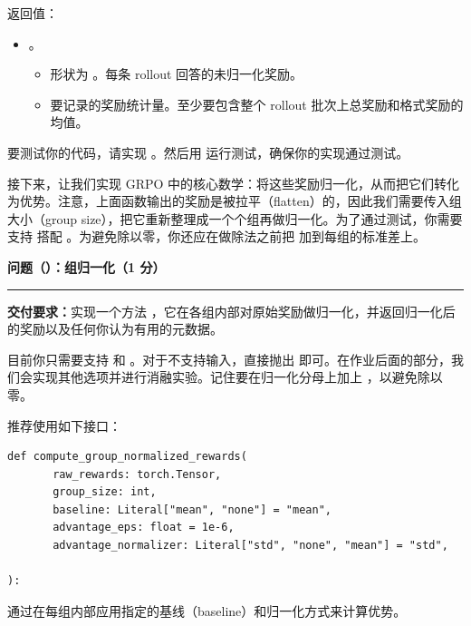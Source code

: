 返回值：

\begin{itemize}
  \item {}。
  \begin{itemize}
    \item {} 形状为 。每条 rollout 回答的未归一化奖励。
    \item {} 要记录的奖励统计量。至少要包含整个 rollout 批次上总奖励和格式奖励的均值。
  \end{itemize}
\end{itemize}

要测试你的代码，请实现 。然后用  运行测试，确保你的实现通过测试。

接下来，让我们实现 GRPO 中的核心数学：将这些奖励归一化，从而把它们转化为优势。注意，上面函数输出的奖励是被拉平（flatten）的，因此我们需要传入组大小（group size），把它重新整理成一个个组再做归一化。为了通过测试，你需要支持  搭配 。为避免除以零，你还应在做除法之前把  加到每组的标准差上。

\medskip
\noindent\textbf{问题（）：组归一化（1 分）}
\par\nobreak\smallskip\hrule\nobreak\medskip

\textbf{交付要求：}实现一个方法 ，它在各组内部对原始奖励做归一化，并返回归一化后的奖励以及任何你认为有用的元数据。

目前你只需要支持  和 。对于不支持输入，直接抛出  即可。在作业后面的部分，我们会实现其他选项并进行消融实验。记住要在归一化分母上加上 ，以避免除以零。

推荐使用如下接口：

\begin{lstlisting}
def compute_group_normalized_rewards(
       raw_rewards: torch.Tensor,
       group_size: int,
       baseline: Literal["mean", "none"] = "mean",
       advantage_eps: float = 1e-6,
       advantage_normalizer: Literal["std", "none", "mean"] = "std",

):
\end{lstlisting}

通过在每组内部应用指定的基线（baseline）和归一化方式来计算优势。

